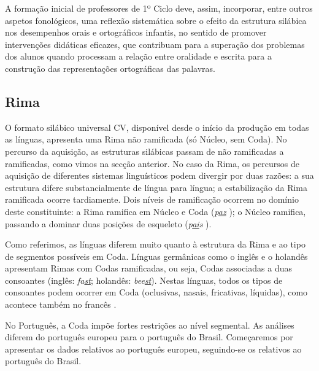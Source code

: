 \documentclass[output=paper]{LSP/langsci}
\begin{document}
A formação inicial de professores de 1º Ciclo deve, assim, incorporar, entre outros aspetos fonológicos, uma reflexão sistemática sobre o efeito da estrutura silábica nos desempenhos orais e ortográficos infantis, no sentido de promover intervenções didáticas eficazes, que contribuam para a superação dos problemas dos alunos quando processam a relação entre oralidade e escrita para a construção das representações ortográficas das palavras.

\subsection{Rima}
\label{subsec:freitas_rima}

O formato silábico universal CV, disponível desde o início da produção em todas as línguas, apresenta uma Rima não ramificada (só Núcleo, sem Coda). No percurso da aquisição, as estruturas silábicas passam de não ramificadas a ramificadas, como vimos na secção anterior. No caso da Rima, os percursos de aquisição de diferentes sistemas linguísticos podem divergir por duas razões: a sua estrutura difere substancialmente de língua para língua; a estabilização da Rima ramificada ocorre tardiamente. Dois níveis de ramificação ocorrem no domínio deste constituinte: a Rima ramifica em Núcleo e Coda (\textit{p\underline{az}} ); o Núcleo ramifica, passando a dominar duas posições de esqueleto (\textit{p\underline{ai}s} ).

Como referimos, as línguas diferem muito quanto à estrutura da Rima e ao tipo de segmentos possíveis em Coda. Línguas germânicas como o inglês e o holandês apresentam Rimas com Codas ramificadas, ou seja, Codas associadas a duas consoantes (inglês: \textit{fa\underline{st}}; holandês: \textit{bee\underline{st}}). Nestas línguas, todos os tipos de consoantes podem ocorrer em Coda (oclusivas, nasais, fricativas, líquidas), como acontece também no francês \citep{fikkert1994,bernhardtstemberger1998,rose200,almeida2011}.

No Português, a Coda impõe fortes restrições ao nível segmental. As análises diferem do português europeu para o português do Brasil. Começaremos por apresentar os dados relativos ao português europeu, seguindo-se os relativos ao português do Brasil.\newpage
\end{document}
